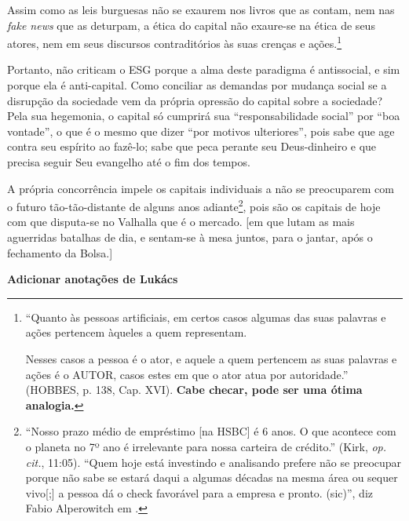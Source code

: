 \documentclass[12pt]{article}
\begin{document}
Assim como as leis burguesas não se exaurem nos livros que as contam, nem nas \textit{fake news} que as deturpam, a ética do capital não exaure-se na ética de seus atores, nem em seus discursos contraditórios às suas crenças e ações.\footnote{``Quanto às pessoas artificiais, em certos casos algumas das suas palavras e ações pertencem àqueles a quem representam.

Nesses casos a pessoa é o ator, e aquele a quem pertencem as suas palavras e ações é o AUTOR, casos estes em que o ator atua por autoridade.'' (HOBBES, p. 138, Cap. XVI). \textbf{Cabe checar, pode ser uma ótima analogia.}} 

Portanto, não criticam o ESG porque a alma deste paradigma é antissocial, e sim porque ela é anti-capital. Como conciliar as demandas por mudança social se a disrupção da sociedade vem da própria opressão do capital sobre a sociedade? Pela sua hegemonia, o capital só cumprirá sua ``responsabilidade social'' por ``boa vontade'', o que é o mesmo que dizer ``por motivos ulteriores'', pois sabe que age contra seu espírito ao fazê-lo; sabe que peca perante seu Deus-dinheiro e que precisa seguir Seu evangelho até o fim dos tempos.

A própria concorrência impele os capitais individuais a não se preocuparem com o futuro tão-tão-distante de alguns anos adiante\footnote{``Nosso prazo médio de empréstimo [na HSBC] é 6 anos. O que acontece com o planeta no 7º ano é irrelevante para nossa carteira de crédito.'' (Kirk, \textit{op. cit.}, 11:05). ``Quem hoje está investindo e analisando prefere não se preocupar porque não sabe se estará daqui a algumas décadas na mesma área ou sequer vivo[;] a pessoa dá o check favorável para a empresa e pronto. (sic)'', diz Fabio Alperowitch em \cite{Angelo2022}.}, pois são os capitais de hoje com que disputa-se no Valhalla que é o mercado. [em que lutam as mais aguerridas batalhas de dia, e sentam-se à mesa juntos, para o jantar, após o fechamento da Bolsa.]

\textbf{Adicionar anotações de Lukács} 
\end{document}
